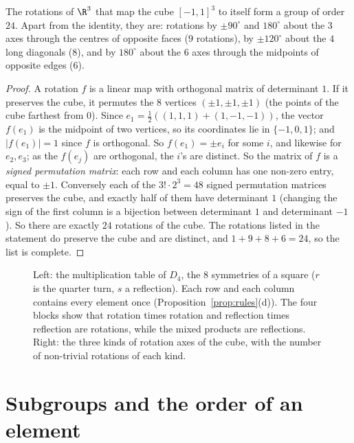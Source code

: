 \begin{proposition}\label{prop:cube}
The rotations of $\R^3$ that map the cube $[-1,1]^3$ to itself form a group of order $24$. Apart from the identity, they are: rotations by $\pm90^\circ$ and $180^\circ$ about the $3$ axes through the centres of opposite faces ($9$ rotations), by $\pm120^\circ$ about the $4$ long diagonals ($8$), and by $180^\circ$ about the $6$ axes through the midpoints of opposite edges ($6$).
\end{proposition}
\begin{proof}
A rotation $f$ is a linear map with orthogonal matrix of determinant $1$. If it preserves the cube, it permutes the $8$ vertices $(\pm1,\pm1,\pm1)$ (the points of the cube farthest from $0$). Since $e_1=\frac12\left((1,1,1)+(1,-1,-1)\right)$, the vector $f(e_1)$ is the midpoint of two vertices, so its coordinates lie in $\{-1,0,1\}$; and $|f(e_1)|=1$ since $f$ is orthogonal. So $f(e_1)=\pm e_i$ for some $i$, and likewise for $e_2,e_3$; as the $f(e_j)$ are orthogonal, the $i$'s are distinct. So the matrix of $f$ is a \emph{signed permutation matrix}: each row and each column has one non-zero entry, equal to $\pm1$. Conversely each of the $3!\cdot2^3=48$ signed permutation matrices preserves the cube, and exactly half of them have determinant $1$ (changing the sign of the first column is a bijection between determinant $1$ and determinant $-1$). So there are exactly $24$ rotations of the cube. The rotations listed in the statement do preserve the cube and are distinct, and $1+9+8+6=24$, so the list is complete.
\end{proof}

\begin{figure}[ht]
\centering
{}
\caption{Left: the multiplication table of $D_4$, the $8$ symmetries of a square ($r$ is the quarter turn, $s$ a reflection). Each row and each column contains every element once (Proposition~\ref{prop:rules}(d)). The four blocks show that rotation times rotation and reflection times reflection are rotations, while the mixed products are reflections. Right: the three kinds of rotation axes of the cube, with the number of non-trivial rotations of each kind.}
\label{fig:symmetries}
\end{figure}

\section{Subgroups and the order of an element}

